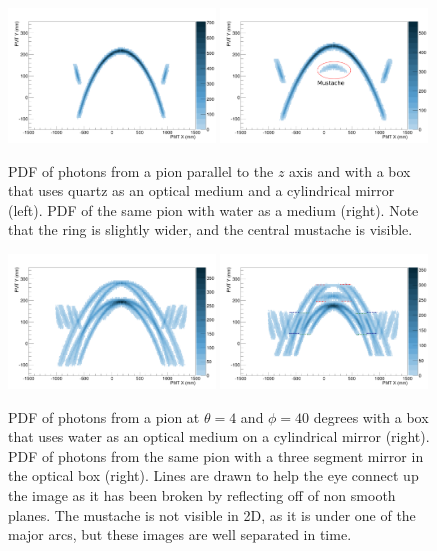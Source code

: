 \begin{figure}[!h]
\centering
\includegraphics[width=0.49\textwidth]{pics/dist_cyl_perp_n147.png}
\includegraphics[width=0.49\textwidth]{pics/dist_cyl_perp_n133_edit.pdf}
\caption{PDF of photons from a pion parallel to the $z$ axis and with a box that uses quartz as an optical medium and a cylindrical mirror (left).  PDF of the same pion with water as a medium (right).  Note that the ring is slightly wider, and the central mustache is visible.}
\end{figure}
\begin{figure}[!h]
\centering
\includegraphics[width=0.49\textwidth]{pics/dist_cyl_440_n133.png}
\includegraphics[width=0.49\textwidth]{pics/dist_440_cannonical_pion_edit.pdf}
\caption{PDF of photons from a pion at $\theta=4$ and $\phi=40$ degrees with a box that uses water as an optical medium on a cylindrical mirror (right).  PDF of photons from the same pion with a three segment mirror in the optical box (right).  Lines are drawn to help the eye connect up the image as it has been broken by reflecting off of non smooth planes.  The mustache is not visible in 2D, as it is under one of the major arcs, but these images are well separated in time.}
\label{fig:cyl_threeseg_recon}
\end{figure}

